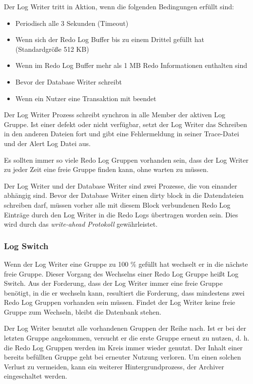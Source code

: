           \begin{merke}
            Der Log Writer tritt in Aktion, wenn die folgenden Bedingungen erfüllt sind:
            \begin{itemize}
              \item Periodisch alle 3 Sekunden (Timeout)
              \item Wenn sich der Redo Log Buffer bis zu einem Drittel gefüllt hat (Standardgröße 512 KB)
              \item Wenn im Redo Log Buffer mehr als 1 MB Redo Informationen enthalten sind
              \item Bevor der Database Writer schreibt
              \item Wenn ein Nutzer eine Transaktion mit  beendet
            \end{itemize}
          \end{merke}
          Der Log Writer Prozess schreibt synchron in alle Member der aktiven Log Gruppe. Ist einer defekt oder nicht verfügbar, setzt der Log Writer das Schreiben in den anderen Dateien fort und gibt eine Fehlermeldung in seiner Trace-Datei und der Alert Log Datei aus.
\clearpage
          \begin{merke}
            Es sollten immer so viele Redo Log Gruppen vorhanden sein, dass der Log Writer zu jeder Zeit eine freie Gruppe finden kann, ohne warten zu müssen.
          \end{merke}
          Der Log Writer und der Database Writer sind zwei Prozesse, die von einander abhängig sind. Bevor der Database Writer einen dirty block in die Datendateien schreiben darf, müssen vorher alle mit diesem Block verbundenen Redo Log Einträge durch den Log Writer in die Redo Logs übertragen worden sein. Dies wird durch das \textit{write-ahead Protokoll} gewährleistet.
          \subsubsection{Log Switch}
            Wenn der Log Writer eine Gruppe zu 100 \% gefüllt hat wechselt er in die nächste freie Gruppe. Dieser Vorgang des Wechselns einer Redo Log Gruppe heißt Log Switch. Aus der Forderung, dass der Log Writer immer eine freie Gruppe benötigt, in die er wechseln kann, resultiert die Forderung, dass mindestens zwei Redo Log Gruppen vorhanden sein müssen. Findet der Log Writer keine freie Gruppe zum Wechseln, bleibt die Datenbank stehen.

            Der Log Writer benutzt alle vorhandenen Gruppen der Reihe nach. Ist er bei der letzten Gruppe angekommen, versucht er die erste Gruppe erneut zu nutzen, d. h. die Redo Log Gruppen werden im Kreis immer wieder genutzt. Der Inhalt einer bereits befüllten Gruppe geht bei erneuter Nutzung verloren. Um einen solchen Verlust zu vermeiden, kann ein weiterer Hintergrundprozess, der Archiver eingeschaltet werden.

